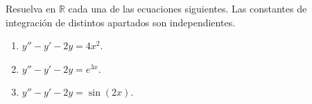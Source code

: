 Resuelva en $\mathbb R$ cada una de las ecuaciones siguientes. Las constantes de integración de distintos apartados son independientes.

\begin{enumerate}[label=(\alph*),ref=\alph*,leftmargin=*]
\item $y''-y'-2y=4x^2$.
\item $y''-y'-2y=e^{3x}$.
\item $y''-y'-2y=\sin(2x)$.
\end{enumerate}
